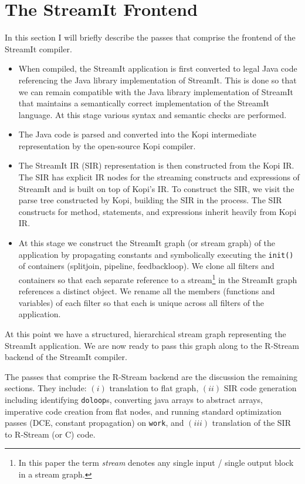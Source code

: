 \documentclass[10pt, letterpaper, onecolumn]{article}
\begin{document}
\section{The StreamIt Frontend}
In this section I will briefly describe the passes that comprise the
frontend of the StreamIt compiler.  
\begin{itemize}
\item When compiled, the StreamIt application is first converted to
  legal Java code referencing the Java library implementation of
  StreamIt.  This is done so that we can remain compatible with the Java
  library implementation of StreamIt that maintains a
  semantically correct implementation of the StreamIt language.  At this
  stage various syntax and semantic checks are performed.
\item The Java code is parsed and converted into the Kopi
  intermediate representation by the open-source Kopi compiler.
\item The StreamIt IR (SIR) representation is then constructed from
  the Kopi IR.  The SIR has explicit IR nodes for the streaming
  constructs and expressions of StreamIt and is built on top of 
  Kopi's IR. To construct the SIR, we visit the parse tree constructed
  by Kopi, building the SIR in the process.  The SIR constructs for
  method, statements, and expressions inherit heavily from Kopi IR.
\item At this stage we construct the StreamIt graph (or stream graph)
  of the application by propagating constants and symbolically
  executing the {\tt init()} of containers (splitjoin, pipeline,
  feedbackloop).  We clone all filters and containers so that each
  separate reference to a stream\footnote{In this paper the term {\it
  stream} denotes any single input / single output block in a stream
  graph.}  in the StreamIt graph references a distinct object.  We
  rename all the members (functions and variables) of each filter so
  that each is unique across all filters of the application.
\end{itemize}
At this point we have a structured, hierarchical stream graph
representing the StreamIt application. We are now ready to pass this
graph along to the R-Stream backend of the StreamIt compiler.

The passes that comprise the R-Stream backend are the discussion the
remaining sections.  They include: $(i)$ translation to flat graph, $(ii)$
SIR code generation including identifying {\tt doloop}s, converting java
arrays to abstract arrays, imperative code creation from flat nodes,
and running standard optimization passes (DCE, constant propagation)
on {\tt work}, and $(iii)$ translation of the SIR to R-Stream (or C) code.
\end{document}
